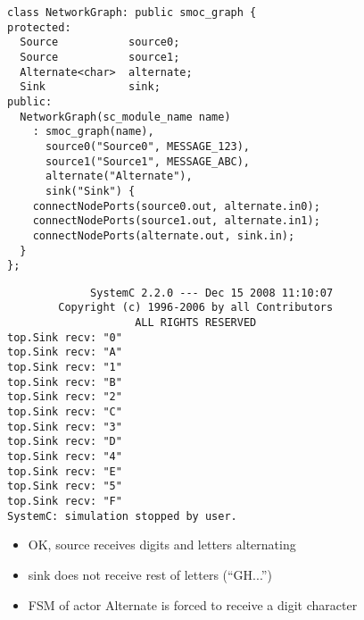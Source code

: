 \begin{frame}[fragile=singleslide]
\begin{lstlisting}
class NetworkGraph: public smoc_graph {
protected:
  Source           source0;
  Source           source1;
  Alternate<char>  alternate;
  Sink             sink;
public:
  NetworkGraph(sc_module_name name)
    : smoc_graph(name),
      source0("Source0", MESSAGE_123),
      source1("Source1", MESSAGE_ABC),
      alternate("Alternate"),
      sink("Sink") {
    connectNodePorts(source0.out, alternate.in0);
    connectNodePorts(source1.out, alternate.in1);
    connectNodePorts(alternate.out, sink.in);
  }
};
\end{lstlisting}
\end{frame}





\begin{frame}[fragile=singleslide]
\begin{lstlisting}
             SystemC 2.2.0 --- Dec 15 2008 11:10:07
        Copyright (c) 1996-2006 by all Contributors
                    ALL RIGHTS RESERVED
top.Sink recv: "0"
top.Sink recv: "A"
top.Sink recv: "1"
top.Sink recv: "B"
top.Sink recv: "2"
top.Sink recv: "C"
top.Sink recv: "3"
top.Sink recv: "D"
top.Sink recv: "4"
top.Sink recv: "E"
top.Sink recv: "5"
top.Sink recv: "F"
SystemC: simulation stopped by user.
\end{lstlisting}
\begin{itemize}
\item OK, source receives digits and letters alternating
\item sink does not receive rest of letters (``GH...'') 
\item FSM of actor Alternate  is forced to receive a digit character
\end{itemize}
\end{frame}







